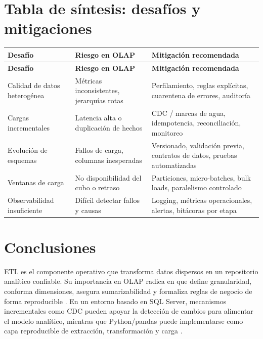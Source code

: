 \documentclass[12pt]{article}
\begin{document}
\section{Tabla de síntesis: desafíos y mitigaciones}
\begin{longtable}{@{}p{}p{}p{}@{}}
\toprule
\textbf{Desafío} & \textbf{Riesgo en OLAP} & \textbf{Mitigación recomendada} \\
\midrule
\endfirsthead
\toprule
\textbf{Desafío} & \textbf{Riesgo en OLAP} & \textbf{Mitigación recomendada} \\
\midrule
\endhead

Calidad de datos heterogénea \cite{ibm_etl} &
Métricas inconsistentes, jerarquías rotas &
Perfilamiento, reglas explícitas, cuarentena de errores, auditoría \cite{kimball_etl_toolkit} \\

Cargas incrementales \cite{ms_cdc_overview} &
Latencia alta o duplicación de hechos &
CDC / marcas de agua, idempotencia, reconciliación, monitoreo \cite{ms_track_changes} \\

Evolución de esquemas &
Fallos de carga, columnas inesperadas &
Versionado, validación previa, contratos de datos, pruebas automatizadas \cite{kimball_etl_toolkit} \\

Ventanas de carga &
No disponibilidad del cubo o retraso &
Particiones, micro-batches, bulk loads, paralelismo controlado \cite{kimball_etl_toolkit} \\

Observabilidad insuficiente \cite{kimball_etl_toolkit} &
Difícil detectar fallos y causas &
Logging, métricas operacionales, alertas, bitácoras por etapa \cite{kimball_etl_toolkit} \\

\bottomrule
\end{longtable}

\section{Conclusiones}
ETL es el componente operativo que transforma datos dispersos en un repositorio analítico confiable. Su importancia en OLAP radica en que define granularidad, conforma dimensiones, asegura sumarizabilidad y formaliza reglas de negocio de forma reproducible \cite{kimball_etl_toolkit,gray_cube}. En un entorno basado en SQL Server, mecanismos incrementales como CDC pueden apoyar la detección de cambios para alimentar el modelo analítico, mientras que Python/pandas puede implementarse como capa reproducible de extracción, transformación y carga \cite{ms_cdc_overview,pandas_to_sql}.
\end{document}
